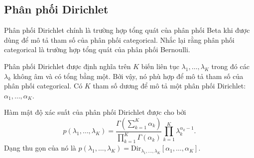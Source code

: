 \subsection{Phân phối Dirichlet}

Phân phối Dirichlet chính là trường hợp tổng quát của phân phối Beta khi được
dùng để mô tả tham số của phân phối categorical. Nhắc lại rằng phân phối
categorical là trường hợp tổng quát của phân phối Bernoulli.

Phân phối Dirichlet được định nghĩa trên $K$ biến liên tục $\lambda_1, \dots,
\lambda_K$ trong đó các $\lambda_k$ không âm và có tổng bằng một. Bởi vậy, nó
phù hợp để mô tả tham số của phân phối categorical.
Có $K$ tham số {dương} để mô tả một phân phối Dirichlet:
$\alpha_1, \dots, \alpha_K$.

Hàm mật độ xác suất của phân phối Dirichlet được cho bởi
\begin{equation}
\label{eqn:30_35}
p(\lambda_1, \dots, \lambda_K) = \frac{\Gamma(\sum_{k=1}^K \alpha_k)}{\prod_{k=1}^K\Gamma(\alpha_k)} \prod_{k=1}^K \lambda_k^{\alpha_k - 1}.
\end{equation}
Dạng thu gọn của nó là
$p(\lambda_1, \dots, \lambda_K) = \text{Dir}_{\lambda_1, \dots, \lambda_K}[\alpha_1, \dots, \alpha_K]$.





